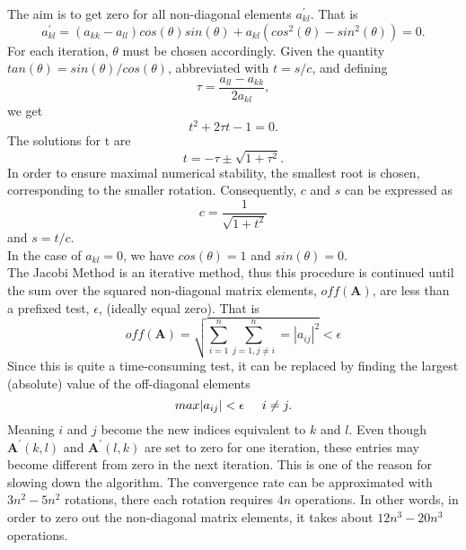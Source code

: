 \documentclass[%
oneside,                 %
final,                   %
10pt]{article}
\begin{document}
The aim is to get zero for all non-diagonal elements $a_{kl}^\prime$.
That is
\begin{equation}
a_{kl}^\prime = (a_{kk}-a_{ll})cos(\theta)sin(\theta) + a_{kl}(cos^2(\theta)-sin^2(\theta)) 
= 0.
\end{equation}
For each iteration, $\theta$ must be chosen accordingly. 
Given the quantity $tan(\theta) = sin(\theta)/cos(\theta)$, abbreviated with $t=s/c$, and defining 
\begin{equation}
\tau = \frac{a_{ll}-a_{kk}}{2a_{kl}},
\end{equation}
we get 
\begin{equation}
t^2+2\tau t - 1 = 0.
\end{equation}
The solutions for t are
\begin{equation}
t = -\tau \pm \sqrt{1+\tau^2}.
\end{equation}
In order to ensure maximal numerical stability, the smallest root is chosen, corresponding to the smaller rotation.
Consequently, $c$ and $s$ can be expressed as
\begin{equation}
c = \frac{1}{\sqrt{1+t^2}}
\end{equation}
and $s=t/c$. \\
In the case of $a_{kl} = 0$, we have $cos(\theta) = 1 $ and $sin(\theta) = 0$. \\
The Jacobi Method is an iterative method, thus this procedure is continued until the sum over the squared non-diagonal matrix elements, $off(\mathbf{A})$, are less than a prefixed test, $\epsilon$, (ideally equal zero). That is
\begin{equation}
off(\mathbf{A}) = \sqrt{\sum_{i=1}^{n} \sum_{j=1, j \neq i}^{n} = |a_{ij}|^2} < \epsilon
\end{equation}
Since this is quite a time-consuming test, it can be replaced by finding the largest (absolute) value of the off-diagonal elements
\begin{equation}
max|a_{ij}| < \epsilon \hspace{0.5cm} i \neq j.
\end{equation}
Meaning $i$ and $j$ become the new indices equivalent to $k$ and $l$.
Even though $\mathbf{A}^\prime(k,l)$ and $ \mathbf{A}^\prime(l,k)$ are set to zero for one iteration, these entries may become different from zero in the next iteration. This is one of the reason for slowing down the algorithm.
The convergence rate can be approximated with $3n^2-5n^2$ rotations, there each rotation requires $4n$ operations. In other words, in order to zero out the non-diagonal matrix elements, it takes about $12n^3-20n^3$ operations.
\end{document}
